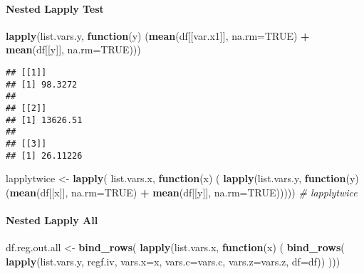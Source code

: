 \documentclass[
]{book}
\newenvironment{Shaded}{\begin{snugshade}}{\end{snugshade}}
\newcommand{\CommentTok}[1]{\textcolor[rgb]{0.56,0.35,0.01}{\textit{#1}}}
\newcommand{\ControlFlowTok}[1]{\textcolor[rgb]{0.13,0.29,0.53}{\textbf{#1}}}
\newcommand{\DataTypeTok}[1]{\textcolor[rgb]{0.13,0.29,0.53}{#1}}
\newcommand{\KeywordTok}[1]{\textcolor[rgb]{0.13,0.29,0.53}{\textbf{#1}}}
\newcommand{\NormalTok}[1]{#1}
\newcommand{\OperatorTok}[1]{\textcolor[rgb]{0.81,0.36,0.00}{\textbf{#1}}}
\newcommand{\OtherTok}[1]{\textcolor[rgb]{0.56,0.35,0.01}{#1}}
\newcommand{\StringTok}[1]{\textcolor[rgb]{0.31,0.60,0.02}{#1}}
\begin{document}
\hypertarget{nested-lapply-test}{%
\paragraph{Nested Lapply Test}\label{nested-lapply-test}}

\begin{Shaded}
\begin{Highlighting}[]
\KeywordTok{lapply}\NormalTok{(list.vars.y, }\ControlFlowTok{function}\NormalTok{(y) (}\KeywordTok{mean}\NormalTok{(df[[var.x1]], }\DataTypeTok{na.rm=}\OtherTok{TRUE}\NormalTok{) }\OperatorTok{+}
\StringTok{                                   }\KeywordTok{mean}\NormalTok{(df[[y]], }\DataTypeTok{na.rm=}\OtherTok{TRUE}\NormalTok{)))}
\end{Highlighting}
\end{Shaded}

\begin{verbatim}
## [[1]]
## [1] 98.3272
## 
## [[2]]
## [1] 13626.51
## 
## [[3]]
## [1] 26.11226
\end{verbatim}

\begin{Shaded}
\begin{Highlighting}[]
\NormalTok{lapplytwice <-}\StringTok{ }\KeywordTok{lapply}\NormalTok{(}
\NormalTok{  list.vars.x, }\ControlFlowTok{function}\NormalTok{(x) (}
    \KeywordTok{lapply}\NormalTok{(list.vars.y, }\ControlFlowTok{function}\NormalTok{(y) (}\KeywordTok{mean}\NormalTok{(df[[x]], }\DataTypeTok{na.rm=}\OtherTok{TRUE}\NormalTok{) }\OperatorTok{+}
\StringTok{                                       }\KeywordTok{mean}\NormalTok{(df[[y]], }\DataTypeTok{na.rm=}\OtherTok{TRUE}\NormalTok{)))))}
\CommentTok{# lapplytwice}
\end{Highlighting}
\end{Shaded}

\hypertarget{nested-lapply-all}{%
\paragraph{Nested Lapply All}\label{nested-lapply-all}}

\begin{Shaded}
\begin{Highlighting}[]
\NormalTok{df.reg.out.all <-}\StringTok{ }\KeywordTok{bind_rows}\NormalTok{(}
  \KeywordTok{lapply}\NormalTok{(list.vars.x,}
         \ControlFlowTok{function}\NormalTok{(x) (}
           \KeywordTok{bind_rows}\NormalTok{(}
             \KeywordTok{lapply}\NormalTok{(list.vars.y, regf.iv,}
                    \DataTypeTok{vars.x=}\NormalTok{x, }\DataTypeTok{vars.c=}\NormalTok{vars.c, }\DataTypeTok{vars.z=}\NormalTok{vars.z, }\DataTypeTok{df=}\NormalTok{df))}
\NormalTok{         )))}
\end{Highlighting}
\end{Shaded}
\end{document}
